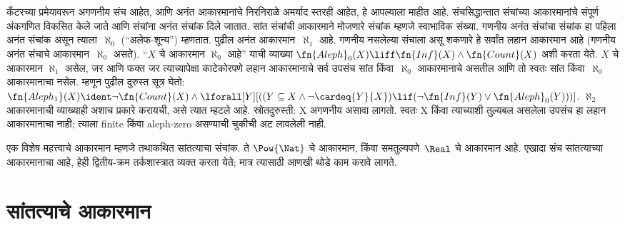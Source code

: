 कँटरच्या प्रमेयावरून अगणनीय संच आहेत,
आणि अनंत आकारमानांचे निरनिराळे अमर्याद स्तरही
आहेत, हे आपल्याला माहीत आहे. संचसिद्धान्तात
संचांच्या आकारमानांचे संपूर्ण अंकगणित विकसित केले
जाते आणि संचांना अनंत संचांक दिले जातात. सांत
संचांची आकारमाने मोजणारे संचांक म्हणजे स्वाभाविक
संख्या. गणनीय अनंत संचांचा संचांक हा पहिला
अनंत संचांक असून त्याला~$\aleph_0$ (``अलेफ-शून्य'')
म्हणतात. पुढील अनंत आकारमान~$\aleph_1$ आहे.
गणनीय नसलेल्या संचाला असू शकणारे हे
सर्वांत लहान आकारमान आहे (गणनीय अनंत संचाचे
आकारमान~$\aleph_0$ असते). ``$X$ चे आकारमान
$\aleph_0$ आहे'' याची व्याख्या
$\fn{Aleph}_0(X) \liff \fn{Inf}(X) \land \fn{Count}(X)$
अशी करता येते. $X$ चे आकारमान $\aleph_1$
असेल, जर आणि फक्त जर त्याच्यापेक्षा काटेकोरपणे लहान
आकारमानाचे सर्व उपसंच सांत किंवा~$\aleph_0$ आकारमानाचे
असतील आणि तो स्वतः सांत किंवा~$\aleph_0$ आकारमानाचा
नसेल. म्हणून पुढील दुरुस्त सूत्र घेतो:
$\fn{Aleph_1}(X) \ident \lnot\fn{Count}(X) \land
\lforall[Y][((Y \subseteq X \land \lnot\cardeq{Y}{X}) \lif
  (\lnot\fn{Inf}(Y) \lor \fn{Aleph}_0(Y)))]$. $\aleph_2$ आकारमानाची
व्याख्याही अशाच प्रकारे करायची, असे त्यात म्हटले आहे.
स्रोतदुरुस्ती: X अगणनीय असावा लागतो. स्वतः X किंवा
त्याच्याशी तुल्यबल असलेला उपसंच हा लहान आकारमानाचा नाही;
त्याला finite किंवा aleph-zero असण्याची चुकीची अट लावलेली नाही.

एक विशेष महत्त्वाचे आकारमान म्हणजे तथाकथित
सांतत्याचा संचांक. ते $\Pow{\Nat}$ चे आकारमान,
किंवा समतुल्यपणे~$\Real$ चे आकारमान आहे.
एखादा संच सांतत्याच्या आकारमानाचा आहे, हेही
द्वितीय-क्रम तर्कशास्त्रात व्यक्त करता येते; मात्र
त्यासाठी आणखी थोडे काम करावे लागते.












\section{सांतत्याचे आकारमान}\label{sol:set:pow:sec}

